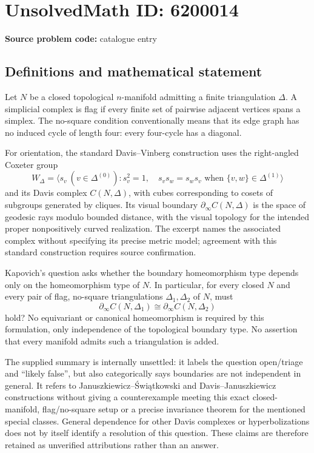 \documentclass[11pt]{article}
\begin{document}
\section*{UnsolvedMath ID: 6200014}
\textbf{Source problem code:} catalogue entry
\subsection{Definitions and mathematical statement}
Let \(N\) be a closed topological \(n\)-manifold admitting a finite triangulation \(\Delta\). A simplicial complex is flag if every finite set of pairwise adjacent vertices spans a simplex. The no-square condition conventionally means that its edge graph has no induced cycle of length four: every four-cycle has a diagonal.

For orientation, the standard Davis--Vinberg construction uses the right-angled Coxeter group
\[
 W_\Delta=\langle s_v\ (v\in\Delta^{(0)}):
 s_v^2=1,\quad s_vs_w=s_ws_v\text{ when }\{v,w\}\in\Delta^{(1)}\rangle
\]
and its Davis complex \(C(N,\Delta)\), with cubes corresponding to cosets of subgroups generated by cliques. Its visual boundary \(\partial_\infty C(N,\Delta)\) is the space of geodesic rays modulo bounded distance, with the visual topology for the intended proper nonpositively curved realization. The excerpt names the associated complex without specifying its precise metric model; agreement with this standard construction requires source confirmation.

Kapovich's question asks whether the boundary homeomorphism type depends only on the homeomorphism type of \(N\). In particular, for every closed \(N\) and every pair of flag, no-square triangulations \(\Delta_1,\Delta_2\) of \(N\), must
\[
 \partial_\infty C(N,\Delta_1)\cong
 \partial_\infty C(N,\Delta_2)
\]
hold? No equivariant or canonical homeomorphism is required by this formulation, only independence of the topological boundary type. No assertion that every manifold admits such a triangulation is added.

The supplied summary is internally unsettled: it labels the question open/triage and ``likely false'', but also categorically says boundaries are not independent in general. It refers to Januszkiewicz--Świątkowski and Davis--Januszkiewicz constructions without giving a counterexample meeting this exact closed-manifold, flag/no-square setup or a precise invariance theorem for the mentioned special classes. General dependence for other Davis complexes or hyperbolizations does not by itself identify a resolution of this question. These claims are therefore retained as unverified attributions rather than an answer.
\end{document}
